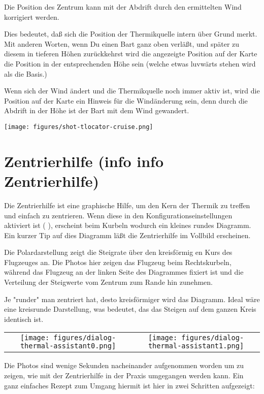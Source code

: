 Die Position des Zentrum kann mit der Abdrift durch den ermittelten Wind korrigiert werden.

Dies bedeutet, daß \xc sich die Position der Thermikquelle intern über Grund merkt.
Mit anderen Worten, wenn Du einen Bart ganz oben verläßt, und später zu diesem in tieferen
Höhen zurückkehrst wird die angezeigte Position auf der Karte die Position in der
entsprechenden Höhe sein (welche etwas luvwärts stehen wird als die Basis.)

Wenn sich der Wind ändert und die Thermikquelle noch immer aktiv ist,
wird die Position auf der Karte ein Hinweis für die Windänderung sein, denn
durch die Abdrift in der Höhe ist der Bart mit dem Wind gewandert.
\begin{center}
\texttt{[image: figures/shot-tlocator-cruise.png]}
\end{center}
\section{Zentrierhilfe (info info Zentrierhilfe)}
Die Zentrierhilfe ist eine graphische Hilfe, um den Kern der Thermik zu treffen und einfach zu zentrieren.
Wenn diese in den Konfigurationseinstellungen aktiviert ist ( ), erscheint beim
Kurbeln wodurch ein kleines  rundes Diagramm. Ein kurzer Tip auf dies Diagramm läßt die Zentrierhilfe im Vollbild erscheinen.

Die Polardarstellung zeigt die Steigrate über den kreisförmig en Kurs des Flugzeuges an.
Die Photos hier zeigen das Flugzeug beim Rechtskurbeln, während das Flugzeug an der linken
Seite des Diagrammes fixiert ist und die Verteilung der Steigwerte vom Zentrum zum Rande hin zunehmen.

Je "runder" man zentriert hat, desto kreisförmiger wird das Diagramm. Ideal wäre eine kreisrunde
Darstellung, was bedeutet, das das Steigen auf dem ganzen Kreis identisch ist.

\begin{tabular}{c c}
\texttt{[image: figures/dialog-thermal-assistant0.png]}&
\texttt{[image: figures/dialog-thermal-assistant1.png]}\\
\end{tabular}

Die Photos sind wenige Sekunden nacheinander aufgenommen worden um zu zeigen, wie mit der Zentrierhilfe
in  der Praxis umgegangen  werden kann. Ein ganz einfaches Rezept zum Umgang hiermit ist hier in zwei Schritten aufgezeigt:

